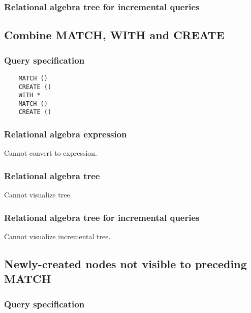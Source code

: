 	\subsubsection*{Relational algebra tree for incremental queries}

	\subsection{Combine MATCH, WITH and CREATE}

	\subsubsection*{Query specification}

	\begin{lstlisting}
	MATCH ()
	CREATE ()
	WITH *
	MATCH ()
	CREATE ()
	\end{lstlisting}


	\subsubsection*{Relational algebra expression}

	Cannot convert to expression.

	\subsubsection*{Relational algebra tree}

	Cannot visualize tree.

	\subsubsection*{Relational algebra tree for incremental queries}

	Cannot visualize incremental tree.
	\subsection{Newly-created nodes not visible to preceding MATCH}

	\subsubsection*{Query specification}

